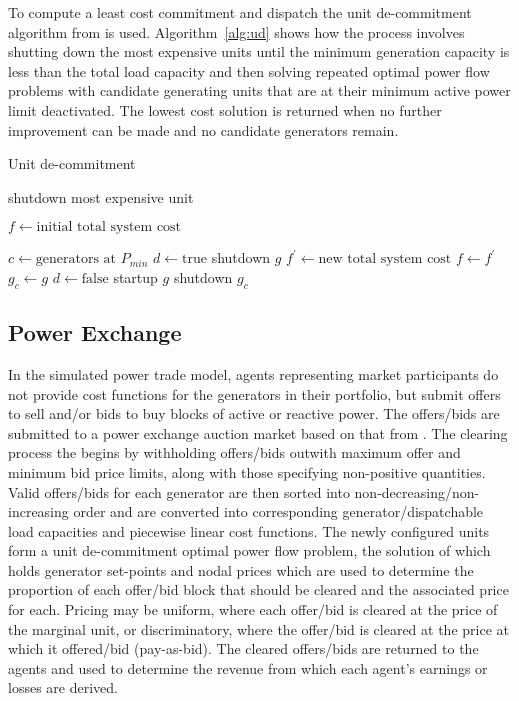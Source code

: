 To compute a least cost commitment and dispatch the unit de-commitment algorithm from
 is used.  Algorithm~\ref{alg:ud} shows how the
process involves shutting down the most expensive units until
the minimum generation capacity is less than the total load capacity and then solving repeated
optimal power flow problems with candidate generating units that are at their
minimum active power limit deactivated.  The lowest cost solution is returned
when no further improvement can be made and no candidate generators remain.
\begin{algorithm}%
\caption{Unit de-commitment}
\label{alg:ud}
\begin{algorithmic}[1]
	\STATE shutdown most expensive unit
\ENDWHILE

\STATE $f \leftarrow \text{initial total system cost}$

\REPEAT
	\STATE $c \leftarrow \text{generators at } P_{min}$
		\STATE $d \leftarrow \text{true}$
		\STATE shutdown $g$
		\STATE $f^\prime \leftarrow \text{new total system cost}$
			\STATE $f \leftarrow f^\prime$
			\STATE $g_{c} \leftarrow g$
			\STATE $d \leftarrow \text{false}$
		\ENDIF
		\STATE startup $g$
	\ENDFOR
	\STATE shutdown $g_c$
\end{algorithmic}
\end{algorithm}

\subsection{Power Exchange}
In the simulated power trade model, agents representing market participants do
not provide cost functions for the generators in their portfolio, but submit
offers to sell and/or bids to buy blocks of active or reactive power.  The
offers/bids are submitted to a power exchange auction market based on that from
.  The clearing process the begins by withholding
offers/bids outwith maximum offer and minimum bid price limits, along with
those specifying non-positive quantities. Valid offers/bids for each generator
are then sorted into non-decreasing/non-increasing order and are converted
into corresponding generator/dispatchable load capacities and piecewise linear
cost functions. The newly configured units form a unit de-commitment optimal
power flow problem, the solution of which holds generator set-points and nodal
prices which are used to determine the proportion of each offer/bid block that
should be cleared and the associated price for each.  Pricing may be uniform,
where each offer/bid is cleared at the price of the marginal unit, or
discriminatory, where the offer/bid is cleared at the price at which it
offered/bid (pay-as-bid). The cleared offers/bids are returned to the
agents and used to determine the revenue from which each agent's earnings or
losses are derived.

